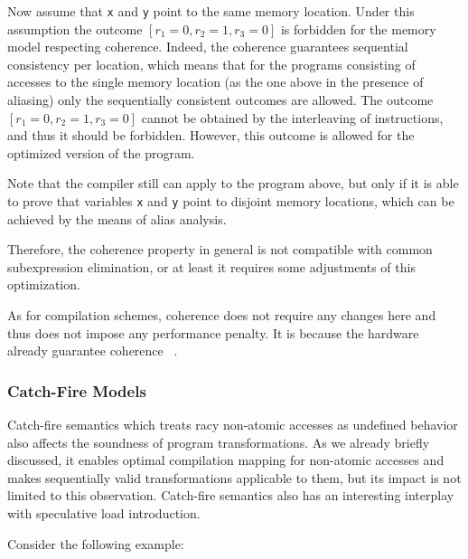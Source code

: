 Now assume that \texttt{x} and \texttt{y} point to the same memory location.
Under this assumption the outcome $[r_1=0, r_2=1, r_3=0]$
is forbidden for the memory model respecting coherence.
Indeed, the coherence guarantees sequential consistency per location, 
which means that for the programs consisting of accesses 
to the single memory location 
(as the one above in the presence of aliasing) 
only the sequentially consistent outcomes are allowed.
The outcome $[r_1=0, r_2=1, r_3=0]$ cannot be obtained 
by the interleaving of instructions, and thus 
it should be forbidden.  
However, this outcome is allowed for 
the optimized version of the program. 

Note that the compiler still can apply \CSE to the program above, 
but only if it is able to prove that variables \texttt{x} and \texttt{y} 
point to disjoint memory locations, which can be achieved 
by the means of alias analysis.  

Therefore, the coherence property in general is not compatible 
with common subexpression elimination, or at least 
it requires some adjustments of this optimization.

As for compilation schemes, coherence does not require 
any changes here and thus does not impose any performance penalty.
It is because the hardware already guarantee coherence%
~\cite{Alglave-al:TOPLAS14, Sarkar-al:PLDI11, Sewell-al:CACM10, Lahav-al:PLDI17}. 

\subsubsection{Catch-Fire Models}
\label{sec:analysis:ub}

Catch-fire semantics which treats racy non-atomic 
accesses as undefined behavior also affects the 
soundness of program transformations. 
As we already briefly discussed, it enables 
optimal compilation mapping for non-atomic accesses and 
makes sequentially valid transformations applicable 
to them, but its impact is not limited to this observation. 
Catch-fire semantics also has an interesting interplay
with speculative load introduction.

Consider the following example:

